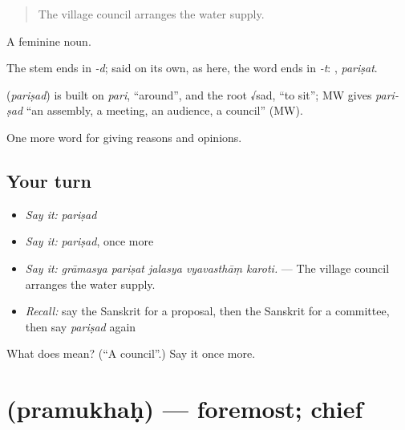 \begin{quote}
The village council arranges the water supply.
\end{quote}

A feminine noun.

The stem ends in \emph{-d}; said on its own, as here, the word ends in \emph{-t}: , \emph{pariṣat}.

\begin{cousinweb}
\textbf{} (\emph{pariṣad}) is built on \emph{pari}, \textquotedblleft{}around\textquotedblright{}, and the root √sad, \textquotedblleft{}to sit\textquotedblright{}; MW gives \emph{pari-ṣad} \textquotedblleft{}an assembly, a meeting, an audience, a council\textquotedblright{} (MW).
\end{cousinweb}

\begin{grammarlens}[title={What you've built}]
One more word for giving reasons and opinions.
\end{grammarlens}

\subsection*{Your turn}
\begin{itemize}
\raggedright
  \item \emph{Say it:} \emph{pariṣad}
  \item \emph{Say it:} \emph{pariṣad}, once more
  \item \emph{Say it:} \emph{grāmasya pariṣat jalasya vyavasthāṃ karoti.} — The village council arranges the water supply.
  \item \emph{Recall:} say the Sanskrit for a proposal, then the Sanskrit for a committee, then say \emph{pariṣad} again
\end{itemize}

\begin{tcolorbox}[breakable,colback=teal!4,colframe=teal!35!black,title={Before you move on}]
What does  mean? (\textquotedblleft{}A council\textquotedblright{}.) Say it once more.
\end{tcolorbox}
\section[\texorpdfstring{\sk{प्रमुखः} (pramukhaḥ)}{प्रमुखः (pramukhaḥ)}]{ (pramukhaḥ) — foremost; chief}

\label{lesson:SA-C357-pramukhah}



